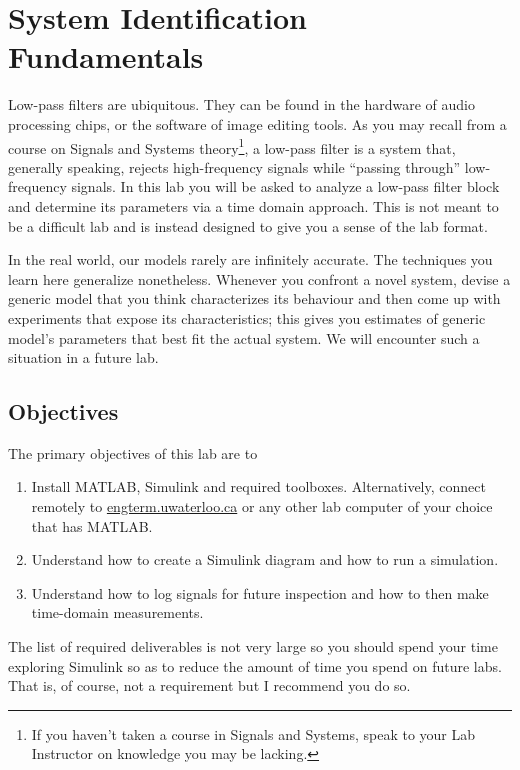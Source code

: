\chapter{System Identification Fundamentals}\label{Lab:1}
Low-pass filters are ubiquitous. They can be found in the hardware of
audio processing chips, or the software of image editing tools. As you may
recall from a course on Signals and Systems theory\footnote{If you haven't
taken a course in Signals and Systems, speak to your Lab Instructor on
knowledge you may be lacking.}, a low-pass filter
is a system that, generally speaking, rejects high-frequency signals while
``passing through'' low-frequency signals. In this lab you will be asked
to analyze a low-pass filter block and determine its parameters via a time
domain approach. This is not meant to be a difficult lab and is instead
designed to give you a sense of the lab format.

In the real world, our models rarely are infinitely accurate. The techniques
you learn here generalize nonetheless. Whenever you confront a novel system,
devise a generic model that you think characterizes its behaviour and then
come up with experiments that expose its characteristics; this gives you
estimates of generic model's parameters that best fit the actual system.
We will encounter such a situation in a future lab.

\section{Objectives}
The primary objectives of this lab are to
\begin{enumerate}[label=(\arabic*)]
  \item{
    Install MATLAB, Simulink and required toolboxes.
    Alternatively, connect remotely to
    \url{engterm.uwaterloo.ca} or any other lab computer of your choice
    that has MATLAB.
  }
  \item{
    Understand how to create a Simulink diagram and how to run
    a simulation.
  }
  \item{
    Understand how to log signals for future inspection and how to then
    make time-domain measurements.
  }
\end{enumerate}
The list of required deliverables is not very large so you should
spend your time exploring Simulink so as to reduce the amount of time
you spend on future labs. That is, of course, not a requirement but I recommend
you do so.

